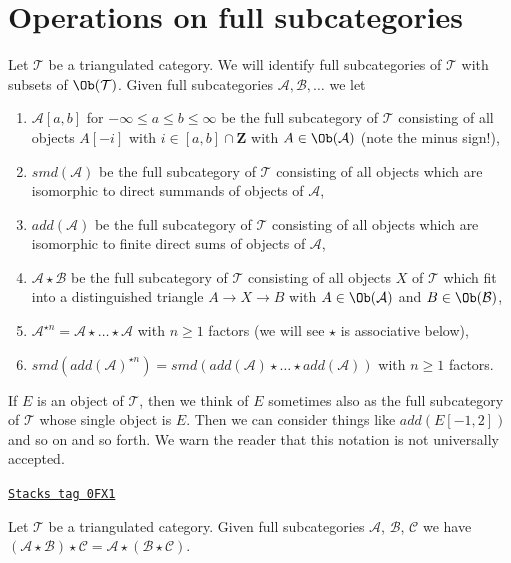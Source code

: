 \section{Operations on full subcategories}
\label{derived-section-operate-on-full}
Let $\mathcal{T}$ be a triangulated category. We will identify full
subcategories of $\mathcal{T}$ with subsets of $\Ob(\mathcal{T})$.
Given full subcategories $\mathcal{A}, \mathcal{B}, \ldots$ we let
\begin{enumerate}
\item $\mathcal{A}[a, b]$ for $-\infty \leq a \leq b \leq \infty$
be the full subcategory of $\mathcal{T}$ consisting of all objects
$A[-i]$ with $i \in [a, b] \cap \mathbf{Z}$
with $A \in \Ob(\mathcal{A})$ (note the minus sign!),
\item $smd(\mathcal{A})$ be the full subcategory of $\mathcal{T}$
consisting of all objects which are isomorphic to direct summands of objects
of $\mathcal{A}$,
\item $add(\mathcal{A})$ be the full subcategory of $\mathcal{T}$
consisting of all objects which are isomorphic to finite direct sums of objects
of $\mathcal{A}$,
\item $\mathcal{A} \star \mathcal{B}$ be the full subcategory of $\mathcal{T}$
consisting of all objects $X$ of $\mathcal{T}$ which fit into a distinguished
triangle $A \to X \to B$ with $A \in \Ob(\mathcal{A})$ and
$B \in \Ob(\mathcal{B})$,
\item $\mathcal{A}^{\star n} = \mathcal{A} \star \ldots \star \mathcal{A}$
with $n \geq 1$ factors (we will see $\star$ is associative below),
\item $smd(add(\mathcal{A})^{\star n}) =
smd(add(\mathcal{A}) \star \ldots \star add(\mathcal{A}))$
with $n \geq 1$ factors.
\end{enumerate}
If $E$ is an object of $\mathcal{T}$, then we think of $E$ sometimes
also as the full subcategory of $\mathcal{T}$ whose single object is $E$.
Then we can consider things like $add(E[-1, 2])$ and so on and so forth.
We warn the reader that this notation is not universally accepted.

\begin{lemma}
\label{derived-lemma-associativity-star}
\href{https://stacks.math.columbia.edu/tag/0FX1}{\texttt{Stacks tag 0FX1}}

Let $\mathcal{T}$ be a triangulated category.
Given full subcategories $\mathcal{A}$, $\mathcal{B}$, $\mathcal{C}$
we have $(\mathcal{A} \star \mathcal{B}) \star \mathcal{C} =
\mathcal{A} \star (\mathcal{B} \star \mathcal{C})$.
\end{lemma}

